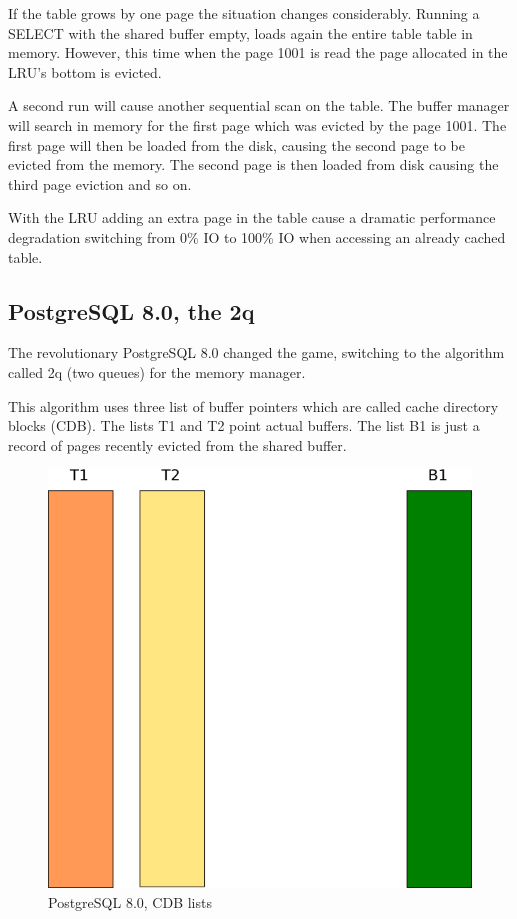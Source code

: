 If the table grows by one page the situation changes considerably. Running a SELECT with the shared buffer empty, loads again the entire table table in memory.
However, this time when the page 1001 is read the page allocated in the LRU's bottom is evicted.

A second run will cause another sequential scan on the table. The buffer manager will search in memory for the first page which was evicted by the page 1001.
The first page will then be loaded from the disk, causing the second page to be evicted from the memory. The second page is then loaded from disk causing the third page eviction and so on.

With the LRU adding an extra page in the table cause a dramatic performance degradation switching from 0\% IO to 100\% IO when accessing an already cached table.


\subsection{PostgreSQL 8.0, the 2q}
The revolutionary PostgreSQL 8.0 changed the game, switching to the algorithm called 2q (two queues) for the memory manager.\newline 

This algorithm uses three list of buffer pointers which are called cache directory blocks (CDB). The lists T1 and T2 point actual buffers. 
The list B1 is just a record of pages recently evicted from the shared buffer. 

\begin{figure}[H]
\includegraphics[scale=0.6]{images/shared_buffer_80.png}

\caption{PostgreSQL 8.0, CDB lists}

\end{figure}

